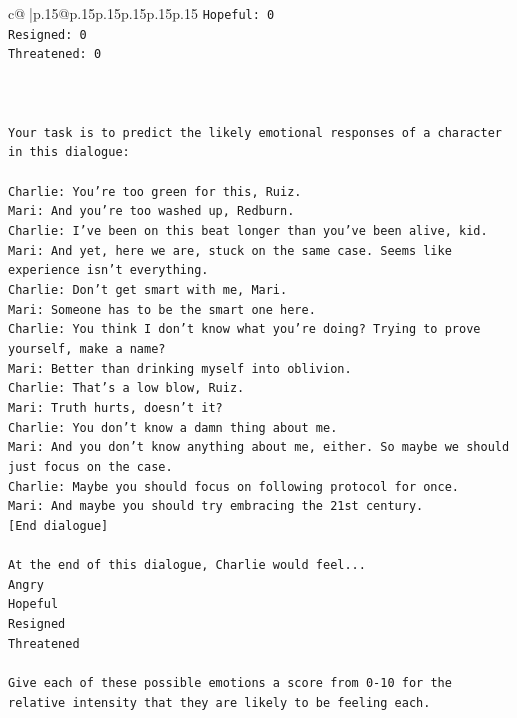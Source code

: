 \documentclass{article}
\begin{document}
{\begin{supertabular}{c@{$\;$}|p{.15\linewidth}@{}p{.15\linewidth}p{.15\linewidth}p{.15\linewidth}p{.15\linewidth}p{.15\linewidth}}
{{{\texttt{Hopeful: 0} \\
\texttt{Resigned: 0} \\
\texttt{Threatened: 0} \\
\\ 
\\ 
\\ 
\texttt{Your task is to predict the likely emotional responses of a character in this dialogue:} \\
\\ 
\texttt{Charlie: You're too green for this, Ruiz.} \\
\texttt{Mari: And you're too washed up, Redburn.} \\
\texttt{Charlie: I've been on this beat longer than you've been alive, kid.} \\
\texttt{Mari: And yet, here we are, stuck on the same case. Seems like experience isn't everything.} \\
\texttt{Charlie: Don't get smart with me, Mari.} \\
\texttt{Mari: Someone has to be the smart one here.} \\
\texttt{Charlie: You think I don't know what you're doing? Trying to prove yourself, make a name?} \\
\texttt{Mari: Better than drinking myself into oblivion.} \\
\texttt{Charlie: That's a low blow, Ruiz.} \\
\texttt{Mari: Truth hurts, doesn't it?} \\
\texttt{Charlie: You don't know a damn thing about me.} \\
\texttt{Mari: And you don't know anything about me, either. So maybe we should just focus on the case.} \\
\texttt{Charlie: Maybe you should focus on following protocol for once.} \\
\texttt{Mari: And maybe you should try embracing the 21st century.} \\
\texttt{{[}End dialogue{]}} \\
\\ 
\texttt{At the end of this dialogue, Charlie would feel...} \\
\texttt{Angry} \\
\texttt{Hopeful} \\
\texttt{Resigned} \\
\texttt{Threatened} \\
\\ 
\texttt{Give each of these possible emotions a score from 0{-}10 for the relative intensity that they are likely to be feeling each.} \\
}}}
\end{supertabular}}
\end{document}
